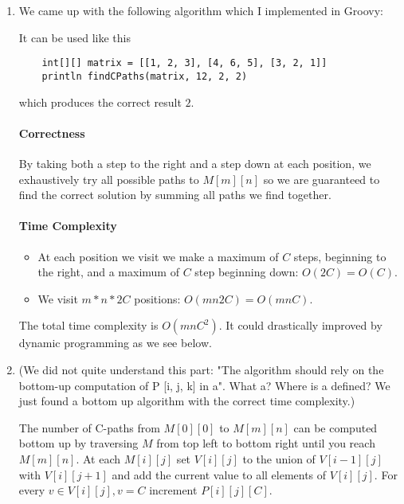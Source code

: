 \documentclass[12pt, a4paper]{article}
\begin{document}
\section{} %
\begin{enumerate}[a]
	\item %
	We came up with the following algorithm which I implemented in Groovy:

	

	It can be used like this

	\begin{lstlisting}
	int[][] matrix = [[1, 2, 3], [4, 6, 5], [3, 2, 1]]
	println findCPaths(matrix, 12, 2, 2)
	\end{lstlisting}

	which produces the correct result $2$.

	\paragraph{Correctness}

	By taking both a step to the right and a step down at each position, we exhaustively try all possible paths to $M[m][n]$ so we are guaranteed to find the correct solution by summing all paths we find together.

	\paragraph{Time Complexity}

	\begin{itemize}
		\item At each position we visit we make a maximum of $C$ steps, beginning to the right, and a maximum of $C$ step beginning down: $O(2C) = O(C)$.
		\item We visit $m * n * 2C$ positions: $O(mn2C) = O(mnC)$.
	\end{itemize}

	The total time complexity is $O(mnC^2)$. It could drastically improved by dynamic programming as we see below.

	\item %
	(We did not quite understand this part: "The algorithm should rely on the bottom-up computation of P [i, j, k] in a". What a? Where is a defined? We just found a bottom up algorithm with the correct time complexity.)

	The number of C-paths from $M[0][0]$ to $M[m][n]$ can be computed bottom up by traversing $M$ from top left to bottom right until you reach $M[m][n]$. At each $M[i][j]$ set $V[i][j]$ to the union of $V[i - 1][j]$ with $V[i][j + 1]$ and add the current value to all elements of $V[i][j]$. For every $v \in V[i][j], v = C$ increment $P[i][j][C]$.


\end{enumerate}
\end{document}
